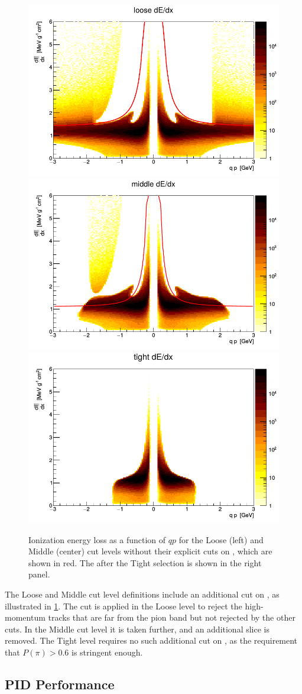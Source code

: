 \begin{figure}[t]
\includegraphics[width=.32\linewidth]{dedx_loose.png}
\includegraphics[width=.32\linewidth]{dedx_mid.png}
\includegraphics[width=.32\linewidth]{dedx_tight.png}
\caption{Ionization energy loss \dEdx as a function of $qp$ for the Loose (left) and Middle (center) cut levels without their explicit cuts on \dEdx, which are shown in red. The \dEdx after the Tight selection is shown in the right panel.}
\label{fig:dedx}
\end{figure}

The Loose and Middle cut level definitions include an additional cut on \dEdx, as illustrated in \cref{fig:dedx}.
The cut is applied in the Loose level to reject the high-momentum tracks that are far from the pion band but not rejected by the other cuts.
In the Middle cut level it is taken further, and an additional slice is removed.
The Tight level requires no such additional cut on \dEdx, as the requirement that $P(\pi) > 0.6$ is stringent enough.


\subsection{PID Performance}

